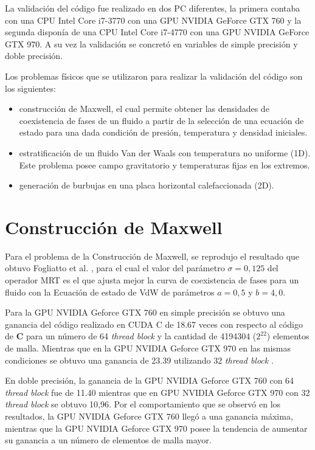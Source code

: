 La validación del código fue realizado en dos PC diferentes, la primera contaba con una CPU Intel Core i7-3770 con una GPU NVIDIA GeForce GTX 760 y la segunda disponía de una CPU Intel Core i7-4770 con una GPU NVIDIA GeForce GTX 970. A su vez la validación se concretó en variables de simple precisión y doble precisión.

Los problemas físicos  que se utilizaron para realizar la validación del código son los siguientes:

\begin{itemize}
    
    \item construcción de Maxwell, el cual permite obtener las densidades de coexistencia de fases de un fluido a partir de la selección de una ecuación de estado para una dada condición de  presión, temperatura y densidad iniciales.

    \item estratificación de un fluido Van der Waals con temperatura no uniforme (1D). Este problema posee campo gravitatorio y temperaturas fijas en los extremos.

    \item generación de burbujas en una placa horizontal calefaccionada (2D).

\end{itemize}

\section{Construcción de Maxwell}

Para el problema de la Construcción de Maxwell, se reprodujo el resultado que obtuvo Fogliatto et al. \cite{fogliatto2019simulation}, para el cual el valor del parámetro $\sigma = 0,125$ del operador MRT es el que ajusta mejor la curva de coexistencia de fases para un fluido con la Ecuación de estado de VdW de parámetros $ a = 0,5 $ y $ b = 4,0 $. 

Para la GPU NVIDIA Geforce GTX 760 en simple precisión se obtuvo una ganancia del código realizado en \textsc{CUDA C} de 18.67 veces con respecto al código de \textbf{C} para un número de 64 \textit{thread block} y la cantidad de 4194304 ($2^{22}$) elementos de malla. Mientras que en la  GPU NVIDIA Geforce GTX 970 en las mismas condiciones se obtuvo una ganancia de 23.39 utilizando 32 \textit{thread block} .

En doble precisión, la ganancia de la GPU NVIDIA Geforce GTX 760 con 64 \textit{thread block} fue de 11.40 mientras que en GPU NVIDIA Geforce GTX 970 con 32 \textit{thread block} se obtuvo 10,96. Por el comportamiento que se observó en los resultados, la GPU NVIDIA Geforce GTX 760 llegó a una ganancia máxima, mientras que la GPU NVIDIA Geforce GTX 970 posee la tendencia de aumentar su ganancia a un número de elementos de malla mayor.

